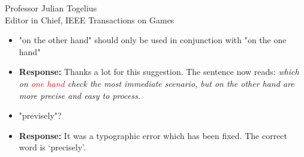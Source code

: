 \documentclass[10pt]{letter} %
\begin{document}
\begin{letter}{Professor Julian Togelius \\ Editor in Chief, IEEE Transactions on Games}
\begin{enumerate}
\begin{itemize}
\begin{itemize}
				\item 	"on the other hand" should only be used in conjunction with "on the one hand"
				\item {\bf Response:} 
                                  Thanks a lot for this suggestion. The sentence now reads: {\em which on \textcolor{red}{one hand} check the most immediate scenario, but on the other hand are more precise and easy to process.}
				\\
				\item 	"previsely"?
				\item {\bf Response:} It was a typographic error which has been fixed. The correct word is `precisely'.
			
			\end{itemize}
\end{itemize}	

\end{enumerate}
 


\end{letter}
\end{document}
